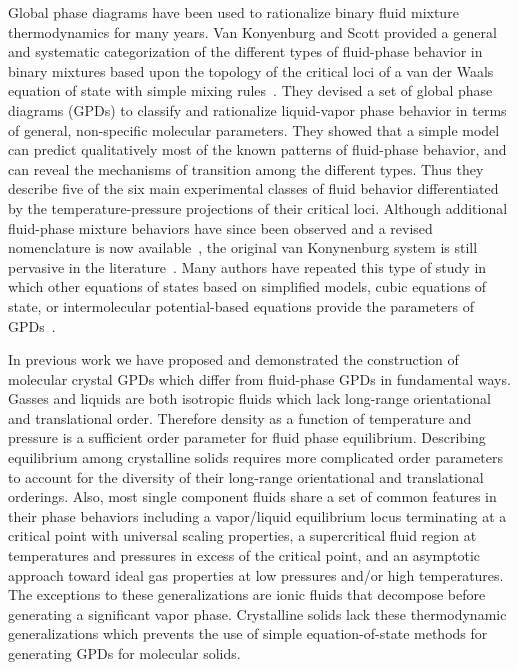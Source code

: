 \documentclass[preprint]{iucr}              %
\begin{document}
Global phase diagrams have been used to rationalize binary fluid mixture
thermodynamics for many years.  Van Konyenburg and Scott provided a general and
systematic categorization of the different types of fluid-phase behavior in
binary mixtures based upon the topology of the critical loci of a van der Waals
equation of state with simple mixing rules~\cite{vanKonynenburg80}.  They
devised a set of global phase diagrams (GPDs) to classify and rationalize
liquid-vapor phase behavior in terms of general, non-specific molecular
parameters.  They showed that a simple model can predict qualitatively most of
the known patterns of fluid-phase behavior, and can reveal the mechanisms of
transition among the different types.  Thus they describe five of the six main
experimental classes of fluid behavior differentiated by the
temperature-pressure projections of their critical loci.  Although additional
fluid-phase mixture behaviors have since been observed and a revised
nomenclature is now available~\cite{Bolz98}, the original van Konynenburg system
is still pervasive in the
literature~\cite{AparicioMartinez07a,AparicioMartinez07b,Cismondi07}. Many
authors have repeated this type of study in which other equations of states
based on simplified models, cubic equations of state, or intermolecular
potential-based equations provide the parameters of
GPDs~\cite{Polishuk00,Polishuk02,vanPelt95}.
 
In previous work we have proposed and demonstrated the construction of molecular
crystal GPDs which differ from fluid-phase GPDs in fundamental ways.  Gasses and
liquids are both isotropic fluids which lack long-range orientational and
translational order.  Therefore density as a function of temperature and
pressure is a sufficient order parameter for fluid phase equilibrium. 
Describing equilibrium among crystalline solids requires more complicated order
parameters to account for the diversity of their long-range orientational and
translational orderings.  Also, most single component fluids share a set of
common features in their phase behaviors including a vapor/liquid equilibrium
locus terminating at a critical point with universal scaling properties, a
supercritical fluid region at temperatures and pressures in excess of the
critical point, and an asymptotic approach toward ideal gas properties at low
pressures and/or high temperatures.  The exceptions to these generalizations are
ionic fluids that decompose before generating a significant vapor phase. 
Crystalline solids lack these thermodynamic generalizations which prevents the
use of simple equation-of-state methods for generating GPDs for molecular
solids.
\end{document}
